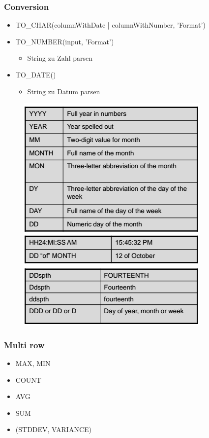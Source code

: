 \subsubsection{Conversion}
\begin{itemize}
    \item TO\_CHAR(columnWithDate | columnWithNumber, 'Format')
    \item TO\_NUMBER(input, 'Format')
    \begin{itemize}
        \item String zu Zahl parsen
    \end{itemize}
    \item TO\_DATE()
    \begin{itemize}
        \item String zu Datum parsen
    \end{itemize}
\end{itemize}
\begin{figure}[H]
    \centering 
    \includegraphics[]{res/themenkorb_2/format.png}
\end{figure}
\subsubsection{Multi row}
\begin{itemize}
    \item MAX, MIN
    \item COUNT
    \item AVG
    \item SUM
    \item (STDDEV, VARIANCE)
\end{itemize}

